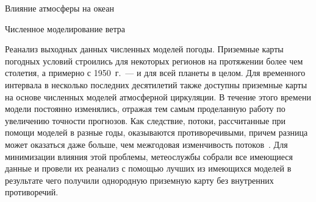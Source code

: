 \begin{chapter}{Влияние атмосферы на океан}
\begin{section}{Численное моделирование ветра}
\begin{paragraph}{Реанализ выходных данных численных моделей погоды.}
Приземные карты погодных условий строились для некоторых регионов 
на протяжении более чем столетия, а примерно с 1950~г.~--- и для всей планеты 
в целом. Для временного интервала в несколько последних десятилетий также
доступны приземные карты на основе численных моделей атмосферной циркуляции.
В течение этого времени модели постоянно изменялись, отражая тем самым 
проделанную работу по увеличению точности прогнозов. Как следствие, потоки, 
рассчитанные при помощи моделей в разные годы, оказываются 
противоречивыми, причем разница может оказаться даже больше, чем межгодовая
изменчивость потоков~\cite{White:1996}. Для минимизации влияния этой проблемы,
метеослужбы собрали все имеющиеся данные и провели их реанализ
с помощью лучших из имеющихся моделей в результате чего получили однородную 
приземную карту без внутренних противоречий.
%


\end{paragraph}
\end{section}
\end{chapter}
